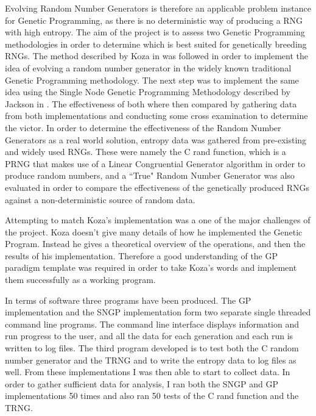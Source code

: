 \documentclass[a4paper,10.5pt]{article}
\begin{document}
Evolving Random Number Generators is therefore an applicable problem instance for Genetic Programming, as there is no deterministic way of producing a RNG with high entropy.  The aim of the project is to assess two Genetic Programming methodologies in order to determine which is best suited for genetically breeding RNGs. The method described by Koza in \cite{kozarng} was followed in order to implement the idea of evolving a random number generator in the widely known traditional Genetic Programming methodology. The next step was to implement the same idea using the Single Node Genetic Programming Methodology described by Jackson in \cite{jacksonsngp}. The effectiveness of both where then compared by gathering data from both implementations and conducting some cross examination to determine the victor. In order to determine the effectiveness of the Random Number Generators as a real world solution, entropy data was gathered from pre-existing and widely used RNGs. These were namely the C rand function, which is a PRNG that makes use of a Linear Congruential Generator algorithm in order to produce random numbers, and a ``True" Random Number Generator was also evaluated in order to compare the effectiveness of the genetically produced RNGs against a non-deterministic source of random data. 

Attempting to match Koza's implementation was a one of the major challenges of the project. Koza doesn't give many details of how he implemented the Genetic Program. Instead he gives a theoretical overview of the operations, and then the results of his implementation. Therefore a good understanding of the GP paradigm template was required in order to take Koza's words and implement them successfully as a working program. 

In terms of software three programs have been produced. The GP implementation and the SNGP implementation form two separate single threaded command line programs. The command line interface displays information and run progress to the user, and all the data for each generation and each run is written to log files. 
The third program developed is to test both the C random number generator and the TRNG and to write the entropy data to log files as well.
From these implementations I was then able to start to collect data. In order to gather sufficient data for analysis, I ran both the SNGP and GP implementations 50 times and also ran 50 tests of the C rand function and the TRNG. 
\end{document}
